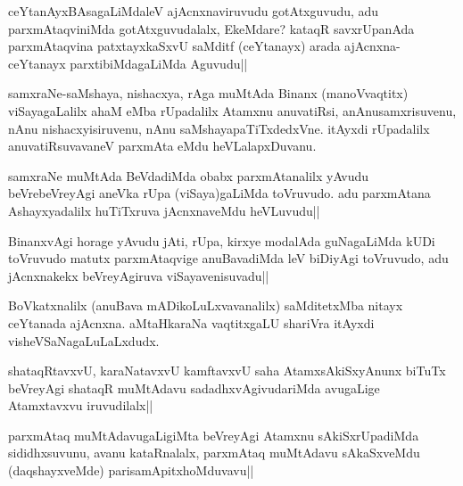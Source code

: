 \begin{artha}
ceYtanAyxBAsagaLiMdaleV ajAcnxnaviruvudu gotAtxguvudu, adu parxmAtaqviniMda gotAtxguvudalalx, EkeMdare? kataqR savxrUpanAda parxmAtaqvina patxtayxkaSxvU saMditf (ceYtanayx) arada ajAcnxna- ceYtanayx parxtibiMdagaLiMda Aguvudu||
\end{artha}


\begin{artha}%
samxraNe-saMshaya, nishacxya, rAga muMtAda Binanx (manoVvaqtitx) viSayagaLalilx ahaM eMba rUpadalilx Atamxnu anuvatiRsi, anAnusamxrisuvenu, nAnu nishacxyisiruvenu, nAnu saMshayapaTiTxdedxVne. itAyxdi rUpadalilx anuvatiRsuvavaneV parxmAta eMdu heVLalapxDuvanu.
\end{artha}


\begin{artha}
samxraNe muMtAda BeVdadiMda obabx parxmAtanalilx yAvudu beVrebeVreyAgi aneVka rUpa (viSaya)gaLiMda toVruvudo. adu parxmAtana Ashayxyadalilx huTiTxruva jAcnxnaveMdu heVLuvudu||
\end{artha}


\begin{artha}
BinanxvAgi horage yAvudu jAti, rUpa, kirxye modalAda guNagaLiMda kUDi toVruvudo matutx parxmAtaqvige anuBavadiMda leV biDiyAgi toVruvudo, adu jAcnxnakekx beVreyAgiruva viSayavenisuvadu||
\end{artha}


\begin{artha}
BoVkatxnalilx (anuBava mADikoLuLxvavanalilx) saMditetxMba nitayx ceYtanada ajAcnxna. aMtaHkaraNa vaqtitxgaLU shariVra itAyxdi visheVSaNagaLuLaLxdudx. 
\end{artha}

\begin{artha}%
shataqRtavxvU, karaNatavxvU kamftavxvU saha AtamxsAkiSxyAnunx biTuTx beVreyAgi shataqR muMtAdavu sadadhxvAgivudariMda avugaLige Atamxtavxvu iruvudilalx||
\end{artha}


\begin{artha}
parxmAtaq muMtAdavugaLigiMta beVreyAgi Atamxnu sAkiSxrUpadiMda sididhxsuvunu, avanu kataRnalalx, parxmAtaq muMtAdavu sAkaSxveMdu (daqshayxveMde) parisamApitxhoMduvavu||
\end{artha}

